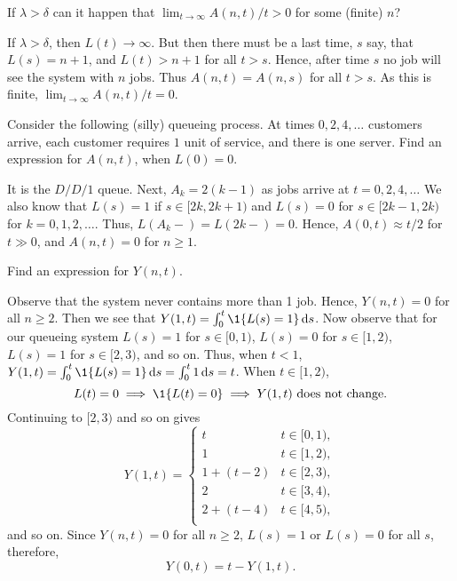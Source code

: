 \begin{exercise} \label{ex:38}
If $\lambda>\delta$ can it happen that $ \lim_{t\to\infty} A(n,t)/t > 0$ for some (finite) $n$? 
\begin{solution}
 If $\lambda > \delta$, then $L(t)\to\infty$.
 But then there must be a last time, $s$ say, that $L(s) = n+1$, and $L(t) > n+1$ for all $t>s$.
 Hence, after time $s$ no job will see the system with $n$ jobs.
 Thus $A(n,t) = A(n,s)$ for all $t>s$.
As this is  finite, $\lim_{t\to\infty}A(n,t)/t=0$.
\end{solution}
\end{exercise}

 \begin{exercise} \label{ex:111} 
Consider the following (silly) queueing process.
 At times $0, 2,4, \ldots$ customers arrive, each customer requires $1$ unit of service, and there is one server.
 Find an expression for $A(n,t)$, when $L(0)=0$.
\begin{solution}
 It is the $D/D/1$ queue. Next, $A_{k} = 2(k-1)$ as jobs arrive at $t=0, 2, 4, \ldots$
 We also know that $L(s)=1$ if $s\in [2k, 2k+1)$ and $L(s)=0$ for $s\in[2k-1, 2k)$ for $k=0, 1, 2, \ldots$.
 Thus, $L(A_k-) = L(2k-)=0$.
 Hence, $A(0,t) \approx t/2$ for $t\gg 0$, and $A(n,t)=0$ for $n\geq 1$.
\end{solution}
\end{exercise}


\begin{exercise} \label{ex:112} 
 Find
 an expression for $Y(n,t)$.
\begin{solution}
Observe that the system never contains
 more than 1 job. Hence, $Y(n,t)=0$ for all $n\geq 2$. Then we see that
 $Y(1,t) = \int_0^t \1{\L(s) = 1}\d s$. Now observe that for our
 queueing system $L(s)=1$ for $s\in[0,1)$, $L(s)=0$ for
 $s\in[1,2)$, $L(s)=1$ for $s\in[2,3)$, and so on. Thus, when
 $t<1$, $Y(1,t)=\int_0^t \1{\L(s)=1} \d s = \int_0^t 1\d s = t$.
 When $t\in[1,2)$, 
 \begin{equation*}
 L(t)=0 \implies \1{\L(t)=0} \implies Y(1,t) \text{ does not change}.
 \end{equation*}
Continuing to $[2,3)$ and so on gives
 \begin{equation*}
 Y(1,t) =
 \begin{cases}
 t & t\in[0,1), \\
 1 & t\in[1,2), \\
 1+(t-2) & t\in[2,3), \\
 2 & t\in[3,4), \\
 2+(t-4) & t\in[4,5), \\
 \end{cases}
 \end{equation*}
 and so on. Since $Y(n,t)=0$ for all $n\geq 2$, $L(s) = 1$ or
 $L(s)=0$ for all $s$, therefore, 
 \begin{equation*}
 Y(0,t) = t-Y(1,t).
 \end{equation*}
\end{solution}
\end{exercise}

